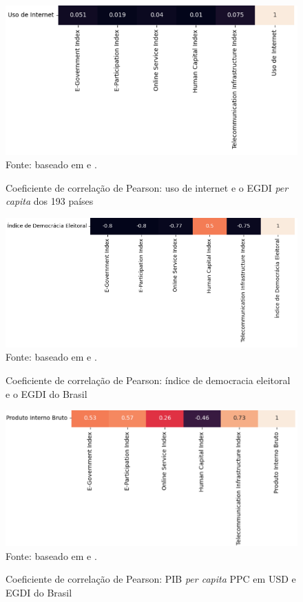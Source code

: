 \begin{figure}[H]
    \centering
    \caption{Coeficiente de correlação de Pearson: uso de internet e o EGDI \textit{per capita} dos 193 países}
    \includegraphics[width=1\linewidth]{figuras/egdi/correlacao5.png}
    \label{fig:correlacao5}
    \footnotesize{Fonte: baseado em \cite{ONU_edgi_mapa} e \cite{ITU_uso_internet_mundo}.}
\end{figure}

\begin{figure}[H]
    \centering
    \caption{Coeficiente de correlação de Pearson: índice de democracia eleitoral e o EGDI do Brasil}
    \includegraphics[width=1\linewidth]{figuras/egdi/correlacao8.png}
    \label{fig:correlacao8}
    \footnotesize{Fonte: baseado em \cite{ONU_edgi_mapa} e \cite{electoral_democracy_index}.}
\end{figure}

\begin{figure}[H]
    \centering
    \caption{Coeficiente de correlação de Pearson: PIB \textit{per capita} PPC em USD e EGDI do Brasil}
    \includegraphics[width=1\linewidth]{figuras/egdi/correlacao6.png}
    \label{fig:correlacao6}
    \footnotesize{Fonte: baseado em \cite{ONU_edgi_mapa} e \cite{WB_pib_per_capita_paises}.}
\end{figure}

